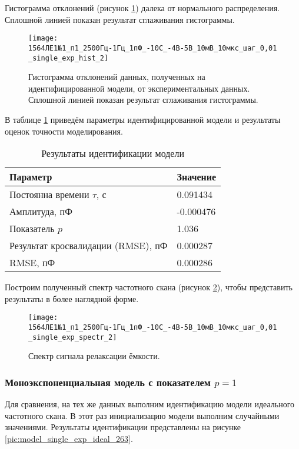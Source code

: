 	Гистограмма отклонений (рисунок \ref{pic:hist_monoexp_p_negative_263}) 
	далека от нормального распределения. Сплошной линией показан результат 
	сглаживания гистограммы.

	\begin{figure}[!htp]
		\centering
		\texttt{[image: 1564ЛЕ1№1\_п1\_2500Гц-1Гц\_1пФ\_-10С\_-4В-5В\_10мВ\_10мкс\_шаг\_0,01\_single\_exp\_hist\_2]}
		\caption{Гистограмма отклонений данных, полученных на идентифицированной 
		         модели, от экспериментальных данных. Сплошной линией показан 
		         результат сглаживания гистограммы.}
		\label{pic:hist_monoexp_p_negative_263}
	\end{figure}

	В таблице \ref{table:results_monoexp_p_negative_263} приведём параметры 
	идентифицированной модели и результаты оценок точности моделирования.

	\begin{table}[!htp]
    	\centering
    	\caption{Результаты идентификации модели}
		\begin{tabular}{|l|l|}
			\hline
			Параметр                           & Значение   \\ \hline
			Постоянна времени $\tau$, с        &  0.091434  \\ \hline
			Амплитуда, пФ                      & -0.000476	\\ \hline
			Показатель $p$                     &  1.036     \\ \hline
			Результат кросвалидации (RMSE), пФ &  0.000287  \\ \hline
			RMSE, пФ                           &  0.000286  \\ \hline
		\end{tabular}
		\label{table:results_monoexp_p_negative_263}
	\end{table}

	Построим полученный спектр частотного скана (рисунок 
	\ref{pic:spectr_monoexp_p_negative_263}), чтобы представить результаты в 
	более наглядной форме.

	\begin{figure}[!htp]
		\centering
		\texttt{[image: 1564ЛЕ1№1\_п1\_2500Гц-1Гц\_1пФ\_-10С\_-4В-5В\_10мВ\_10мкс\_шаг\_0,01\_single\_exp\_spectr\_2]}
		\caption{Спектр сигнала релаксации ёмкости.}
		\label{pic:spectr_monoexp_p_negative_263}
	\end{figure}

	
	\newpage
	\subsubsection{Моноэкспоненциальная модель с показателем $p=1$}
	Для сравнения, на тех же данных выполним идентификацию модели идеального 
	частотного скана. В этот раз инициализацию модели выполним случайными 
	значениями. Результаты идентификации представлены на рисунке 
	\ref{pic:model_single_exp_ideal_263}.

